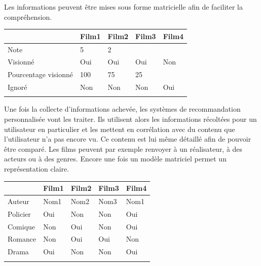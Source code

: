 \documentclass{article}
\begin{document}
Les informations peuvent être mises sous forme matricielle afin de faciliter la compréhension.

\begin{longtable}[c]{lllll}& Film1 & Film2  & Film3 & Film4 \\ \cline{2-5} 
\endfirsthead
%
\endhead
%
\multicolumn{1}{l|}{Note} & \multicolumn{1}{l|}{5}   & \multicolumn{1}{l|}{2}   & \multicolumn{1}{l|}{} & \multicolumn{1}{l|}{} \\ \cline{2-5} 
\multicolumn{1}{l|}{Visionné} & \multicolumn{1}{l|}{Oui} & \multicolumn{1}{l|}{Oui} & \multicolumn{1}{l|}{Oui} & \multicolumn{1}{l|}{Non} \\ \cline{2-5} 
\multicolumn{1}{l|}{Pourcentage visionné} & \multicolumn{1}{l|}{100} & \multicolumn{1}{l|}{75}  & \multicolumn{1}{l|}{25}  & \multicolumn{1}{l|}{}    \\ \cline{2-5} 
\multicolumn{1}{l|}{Ignoré}  & \multicolumn{1}{l|}{Non} & \multicolumn{1}{l|}{Non} & \multicolumn{1}{l|}{Non} & \multicolumn{1}{l|}{Oui} \\ \cline{2-5} 

\label{my-label}\\
\end{longtable}

Une fois la collecte d'informations achevée, les systèmes de recommandation personnalisée vont les traiter. Ils utilisent alors les informations récoltées pour un utilisateur en particulier et les mettent en corrélation avec du contenu que l'utilisateur n'a pas encore vu. Ce contenu est lui même détaillé afin de pouvoir être comparé. Les films peuvent par exemple renvoyer à un réalisateur, à des acteurs ou à des genres. Encore une fois un modèle matriciel permet un représentation claire.

\begin{longtable}[c]{lllll}
 & Film1 & Film2 & Film3 & Film4 \\ \cline{2-5} 
\endhead
%
\multicolumn{1}{l|}{Auteur} & \multicolumn{1}{l|}{Nom1} & \multicolumn{1}{l|}{Nom2} & \multicolumn{1}{l|}{Nom3} & \multicolumn{1}{l|}{Nom1} \\ \cline{2-5} 
\multicolumn{1}{l|}{Policier} & \multicolumn{1}{l|}{Oui} & \multicolumn{1}{l|}{Non} & \multicolumn{1}{l|}{Non} & \multicolumn{1}{l|}{Oui} \\ \cline{2-5} 
\multicolumn{1}{l|}{Comique} & \multicolumn{1}{l|}{Non} & \multicolumn{1}{l|}{Oui} & \multicolumn{1}{l|}{Non} & \multicolumn{1}{l|}{Oui} \\ \cline{2-5} 
\multicolumn{1}{l|}{Romance} & \multicolumn{1}{l|}{Non} & \multicolumn{1}{l|}{Oui} & \multicolumn{1}{l|}{Oui} & \multicolumn{1}{l|}{Non} \\ \cline{2-5} 
\multicolumn{1}{l|}{Drama} & \multicolumn{1}{l|}{Oui} & \multicolumn{1}{l|}{Non} & \multicolumn{1}{l|}{Non} & \multicolumn{1}{l|}{Oui} \\ \cline{2-5} 
\label{my-label2}\\
\end{longtable}
\end{document}
